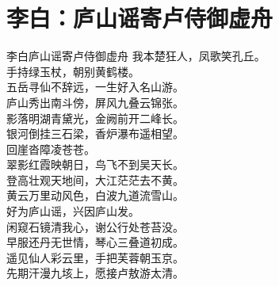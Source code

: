 \documentclass[12pt,oneside,a5paper]{book}
\begin{document}
\chapter{李白：庐山谣寄卢侍御虚舟}
\begin{poemzh}{李白}{庐山谣寄卢侍御虚舟}
我本楚狂人，凤歌笑孔丘。\\
手持绿玉杖，朝别黄鹤楼。\\
五岳寻仙不辞远，一生好入名山游。\\
庐山秀出南斗傍，屏风九叠云锦张。\\
影落明湖青黛光，金阙前开二峰长。\\
银河倒挂三石梁，香炉瀑布遥相望。\\
回崖沓障凌苍苍。\\
翠影红霞映朝日，鸟飞不到吴天长。\\
登高壮观天地间，大江茫茫去不黄。\\
黄云万里动风色，白波九道流雪山。\\
好为庐山谣，兴因庐山发。\\
闲窥石镜清我心，谢公行处苍苔没。\\
早服还丹无世情，琴心三叠道初成。\\
遥见仙人彩云里，手把芙蓉朝玉京。\\
先期汗漫九垓上，愿接卢敖游太清。\\ 
\end{poemzh}
\end{document}
